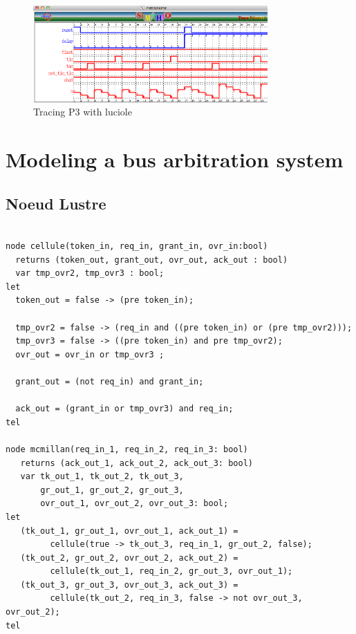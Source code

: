 \documentclass{article}
\begin{document}
\begin{itemize}
\begin{figure}[!ht]
\begin{center}
\includegraphics[width=0.8\textwidth, natwidth=610,natheight=642] {img/trace-obs3.png}
\end{center}
\label{trace-obs3}
\caption{Tracing P3 with luciole}
\end{figure}

\end{itemize}

\section{Modeling a bus arbitration system}

\subsection{Noeud Lustre}

\begin{verbatim}

node cellule(token_in, req_in, grant_in, ovr_in:bool) 
  returns (token_out, grant_out, ovr_out, ack_out : bool)
  var tmp_ovr2, tmp_ovr3 : bool;
let
  token_out = false -> (pre token_in);

  tmp_ovr2 = false -> (req_in and ((pre token_in) or (pre tmp_ovr2)));
  tmp_ovr3 = false -> ((pre token_in) and pre tmp_ovr2);
  ovr_out = ovr_in or tmp_ovr3 ;

  grant_out = (not req_in) and grant_in;

  ack_out = (grant_in or tmp_ovr3) and req_in;
tel

node mcmillan(req_in_1, req_in_2, req_in_3: bool)
   returns (ack_out_1, ack_out_2, ack_out_3: bool)
   var tk_out_1, tk_out_2, tk_out_3,
       gr_out_1, gr_out_2, gr_out_3,
       ovr_out_1, ovr_out_2, ovr_out_3: bool;
let
   (tk_out_1, gr_out_1, ovr_out_1, ack_out_1) = 
         cellule(true -> tk_out_3, req_in_1, gr_out_2, false);
   (tk_out_2, gr_out_2, ovr_out_2, ack_out_2) = 
         cellule(tk_out_1, req_in_2, gr_out_3, ovr_out_1);
   (tk_out_3, gr_out_3, ovr_out_3, ack_out_3) = 
         cellule(tk_out_2, req_in_3, false -> not ovr_out_3, ovr_out_2);
tel
\end{verbatim}
\end{document}
